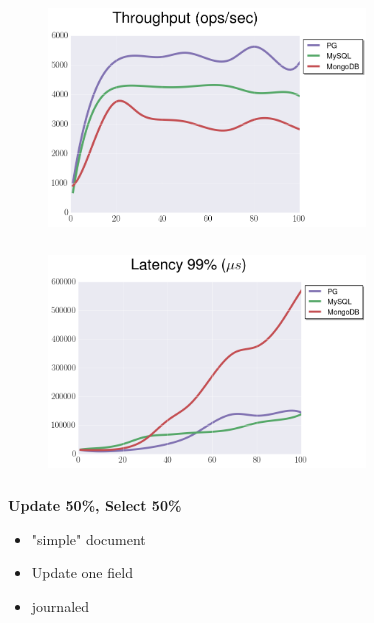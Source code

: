 \documentclass[usenames,dvipsnames, 18pt, compress, aspectratio=169]{beamer}
\begin{document}
\begin{frame}
    \frametitle{}
    \begin{center}
    \begin{figure}
        \includegraphics[width=0.75\textwidth,center]{benchmarks/update_btree_transaction_sync_throughput.png}
    \end{figure}
    \end{center}
\end{frame}

\begin{frame}
    \frametitle{}
    \begin{center}
    \begin{figure}
        \includegraphics[width=0.75\textwidth,center]{benchmarks/update_btree_transaction_sync_latency.png}
    \end{figure}
    \end{center}
\end{frame}

\begin{frame}
    \frametitle{}
    \begin{center}
        \textbf{Update 50\%, Select 50\%}
        \begin{itemize}[label={}]
            \item "simple" document
            \item Update one field
            \item journaled
        \end{itemize}
    \end{center}
\end{frame}
\end{document}
